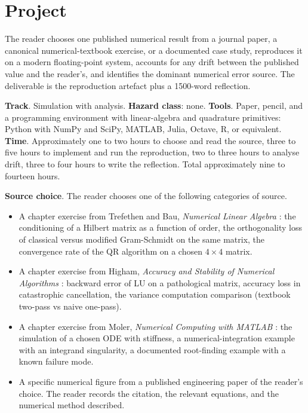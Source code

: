 \section{Project}

\begin{project}
The reader chooses one published numerical result from a journal
paper, a canonical numerical-textbook exercise, or a documented
case study, reproduces it on a modern floating-point system,
accounts for any drift between the published value and the
reader's, and identifies the dominant numerical error source.
The deliverable is the reproduction artefact plus a 1500-word
reflection.

\textbf{Track}. Simulation with analysis. \textbf{Hazard class}:
none. \textbf{Tools}. Paper, pencil, and a programming
environment with linear-algebra and quadrature primitives:
Python with NumPy and SciPy, MATLAB, Julia, Octave, R, or
equivalent. \textbf{Time}. Approximately one to two hours to
choose and read the source, three to five hours to implement and
run the reproduction, two to three hours to analyse drift, three
to four hours to write the reflection. Total approximately nine
to fourteen hours.

\textbf{Source choice}. The reader chooses one of the following
categories of source.

\begin{itemize}[leftmargin=*]
  \item A chapter exercise from Trefethen and Bau,
    \emph{Numerical Linear Algebra}
    \cite{text:trefethen-bau1997}: the conditioning of a Hilbert
    matrix as a function of order, the orthogonality loss of
    classical versus modified Gram-Schmidt on the same matrix,
    the convergence rate of the QR algorithm on a chosen $4
    \times 4$ matrix.
  \item A chapter exercise from Higham, \emph{Accuracy and
    Stability of Numerical Algorithms}
    \cite{text:higham-numerical}: backward error of LU on a
    pathological matrix, accuracy loss in catastrophic
    cancellation, the variance computation comparison
    (textbook two-pass vs naive one-pass).
  \item A chapter exercise from Moler, \emph{Numerical Computing
    with MATLAB} \cite{text:moler-numerical}: the simulation of a
    chosen ODE with stiffness, a numerical-integration example
    with an integrand singularity, a documented root-finding
    example with a known failure mode.
  \item A specific numerical figure from a published engineering
    paper of the reader's choice. The reader records the citation,
    the relevant equations, and the numerical method described.
\end{itemize}


\end{project}
